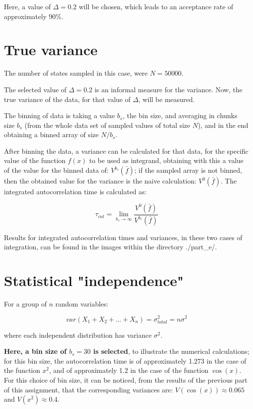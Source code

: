 \documentclass[paper=a4, fontsize=11pt]{scrartcl} %
\numberwithin{equation}{section} %
\numberwithin{figure}{section} %
\numberwithin{table}{section} %
\begin{document}
Here, a value of $\Delta = 0.2 $ will be chosen, which leads to an acceptance rate of approximately 90\%.


\section{True variance}

The number of states sampled in this case, were $N = 50 000$.

The selected value of $\Delta = 0.2$ is an informal measure for the variance. Now, the true variance of the data, for that value of $\Delta$, will be measured.

The binning of data is taking a value $b_{s}$, the bin size, and averaging in chunks size $b_{s}$ (from the whole data set of sampled values of total size $N$), and in the end obtaining a binned array of size $N/b_{s}$.

After binning the data, a variance can be calculated for that data, for the specific value of the function $f(x)$ to be used as integrand, obtaining with this a value of the value for the binned data of: $V^{b_{s}}(\bar{f})$; if the sampled array is not binned, then the obtained value for the variance is the naive calculation: $V^{0}(\bar{f})$. The integrated autocorrelation time is calculated as:

\begin{equation}
\tau_{int} = \lim_{b_{s}\rightarrow \infty}\frac{V^{0}(\bar{f})}{V^{b_{s}}(\bar{f})}
\end{equation}


Results for integrated autocorrelation times and variances, in these two cases of integration, can be found in the images within the directory ./part\_e/.


\section{Statistical "independence"}

For a group of $n$ random variables:

\begin{equation}
var(X_{1}+X_{2}+...+X_{n}) = \sigma_{total}^{2} = n\sigma^{2}
\end{equation}

where each independent distribution has variance $\sigma^{2}$.

\textbf{Here, a bin size of $b_{s} = 30$ is selected}, to illustrate the numerical calculations; for this bin size, the autocorrelation time is of approximately 1.273 in the case of the function $x^{2}$, and of approximately 1.2 in the case of the function $\cos(x)$. For this choice of bin size, it can be noticed, from the results of the previous part of this assignment, that the corresponding variances are: $V(\cos(x)) \approx 0.065$ and $V(x^{2}) \approx 0.4$.
\end{document}
